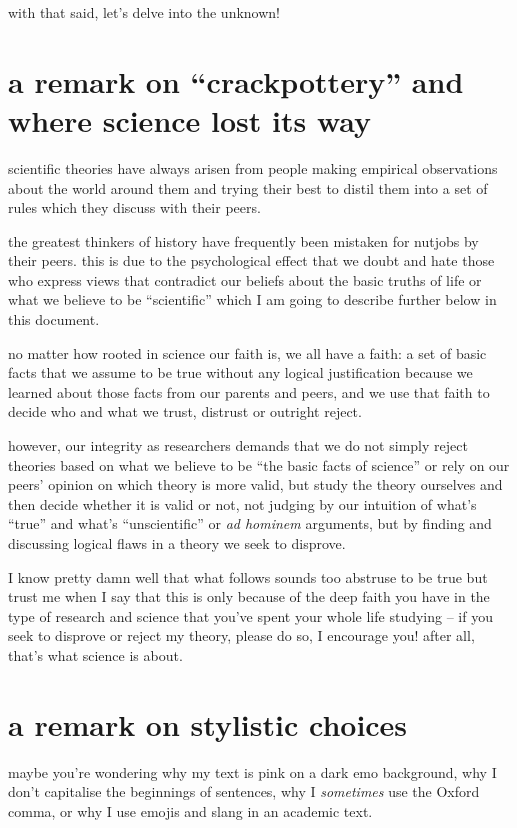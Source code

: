 \documentclass[12pt]{report}
\theoremstyle{definition}
\theoremstyle{remark}
\begin{document}
with that said, let's delve into the unknown!

\section{a remark on ``crackpottery'' and where science lost its way}

scientific theories have always arisen from people making empirical observations about the world around them and trying their best to distil them into a set of rules which they discuss with their peers.

the greatest thinkers of history have frequently been mistaken for nutjobs by their peers. this is due to the psychological effect that we doubt and hate those who express views that contradict our beliefs about the basic truths of life or what we believe to be ``scientific'' which I am going to describe further below in this document.

no matter how rooted in science our faith is, we all have a faith: a set of basic facts that we assume to be true without any logical justification because we learned about those facts from our parents and peers, and we use that faith to decide who and what we trust, distrust or outright reject.

however, our integrity as researchers demands that we do not simply reject theories based on what we believe to be ``the basic facts of science'' or rely on our peers' opinion on which theory is more valid, but study the theory ourselves and then decide whether it is valid or not, not judging by our intuition of what's ``true'' and what's ``unscientific'' or \emph{ad hominem} arguments, but by finding and discussing logical flaws in a theory we seek to disprove.

I know pretty damn well that what follows sounds too abstruse to be true but trust me when I say that this is only because of the deep faith you have in the type of research and science that you've spent your whole life studying -- if you seek to disprove or reject my theory, please do so, I encourage you! after all, that's what science is about.

\section{a remark on stylistic choices}

maybe you're wondering why my text is pink on a dark emo background, why I don't capitalise the beginnings of sentences, why I \emph{sometimes} use the Oxford comma, or why I use emojis and slang in an academic text.
\end{document}
